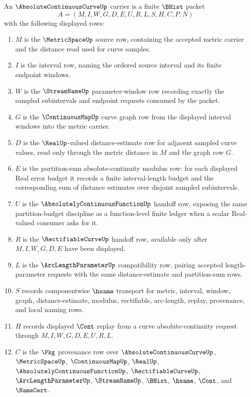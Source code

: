 \begin{definition}
\label{def:absolute-continuous-curve-carrier}
An $\AbsoluteContinuousCurveUp$ carrier is a finite $\BHist$ packet
$$
A=(M,I,W,G,D,E,U,R,L,S,H,C,P,N)
$$
with the following displayed rows:
\begin{enumerate}
\item $M$ is the $\MetricSpaceUp$ source row, containing the accepted metric carrier and the distance read used for curve samples.
\item $I$ is the interval row, naming the ordered source interval and its finite endpoint windows.
\item $W$ is the $\StreamNameUp$ parameter-window row recording exactly the sampled subintervals and endpoint requests consumed by the packet.
\item $G$ is the $\ContinuousMapUp$ curve graph row from the displayed interval windows into the metric carrier.
\item $D$ is the $\RealUp$-valued distance-estimate row for adjacent sampled curve values, read only through the metric distance in $M$ and the graph row $G$.
\item $E$ is the partition-sum absolute-continuity modulus row: for each displayed Real error budget it records a finite interval-length budget and the corresponding sum of distance estimates over disjoint sampled subintervals.
\item $U$ is the $\AbsolutelyContinuousFunctionUp$ handoff row, exposing the same partition-budget discipline as a function-level finite ledger when a scalar Real-valued consumer asks for it.
\item $R$ is the $\RectifiableCurveUp$ handoff row, available only after $M,I,W,G,D,E$ have been displayed.
\item $L$ is the $\ArcLengthParameterUp$ compatibility row, pairing accepted length-parameter requests with the same distance-estimate and partition-sum rows.
\item $S$ records componentwise $\hsame$ transport for metric, interval, window, graph, distance-estimate, modulus, rectifiable, arc-length, replay, provenance, and local naming rows.
\item $H$ records displayed $\Cont$ replay from a curve absolute-continuity request through $M,I,W,G,D,E,U,R,L$.
\item $C$ is the $\Pkg$ provenance row over $\AbsoluteContinuousCurveUp$, $\MetricSpaceUp$, $\ContinuousMapUp$, $\RealUp$, $\AbsolutelyContinuousFunctionUp$, $\RectifiableCurveUp$, $\ArcLengthParameterUp$, $\StreamNameUp$, $\BHist$, $\hsame$, $\Cont$, and $\NameCert$.

\end{enumerate}
\end{definition}
